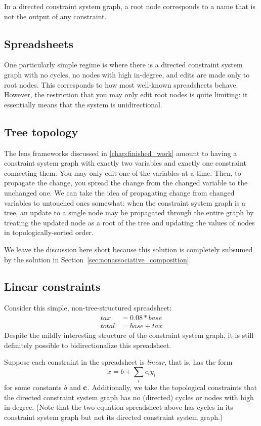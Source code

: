 In a directed constraint system graph, a root node corresponds to a name
that is not the output of any constraint.

\subsection{Spreadsheets}
One particularly simple regime is where there is a directed constraint
system graph with no cycles, no nodes with high in-degree, and edits are
made only to root nodes. This corresponds to how most well-known
spreadsheets behave. However, the restriction that you may only edit root
nodes is quite limiting: it essentially means that the system is
unidirectional.

\subsection{Tree topology}
The lens frameworks discussed in \ref{chap:finished_work} amount to having a
constraint system graph with exactly two variables and exactly one
constraint connecting them. You may only edit one of the variables at a
time. Then, to propagate the change, you spread the change from the changed
variable to the unchanged one.
%
We can take the idea of propagating change from changed variables to
untouched ones somewhat: when the constraint system graph is a tree, an
update to a single node may be propagated through the entire graph by
treating the updated node as a root of the tree and updating the values of
nodes in topologically-sorted order.

We leave the discussion here short because this solution is completely
subsumed by the solution in Section~\ref{sec:nonassociative_composition}.

\subsection{Linear constraints}
Consider this simple, non-tree-structured spreadsheet:
\begin{align*}
    tax &= 0.08*base \\
    total &= base + tax
\end{align*}
Despite the mildly interesting structure of the constraint system graph, it
is still definitely possible to bidirectionalize this spreadsheet.

Suppose each constraint in the spreadsheet is \emph{linear}, that is, has
the form
\[x = b+\sum_ic_iy_i\]
for some constants $b$ and $\bf c$. Additionally, we take the topological
constraints that the directed constraint system graph has no (directed)
cycles or nodes with high in-degree. (Note that the two-equation spreadsheet
above has cycles in its constraint system graph but not its directed
constraint system graph.)

